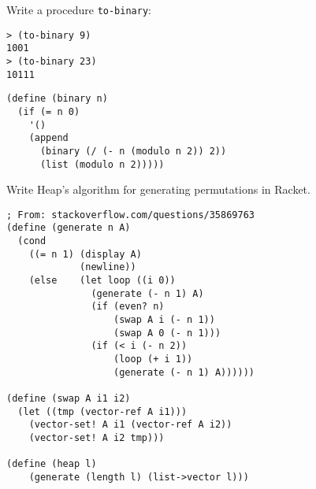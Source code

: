 \begin{questions}
\question
Write a procedure \texttt{to-binary}:
\begin{verbatim}
> (to-binary 9)
1001
> (to-binary 23)
10111
\end{verbatim}

\begin{solution}
  \begin{verbatim}
(define (binary n)
  (if (= n 0)
    '()
    (append
      (binary (/ (- n (modulo n 2)) 2))
      (list (modulo n 2)))))
  \end{verbatim}
\end{solution}

\question
Write Heap's algorithm for generating permutations in Racket.

\begin{solution}
  \begin{verbatim}
; From: stackoverflow.com/questions/35869763
(define (generate n A)
  (cond
    ((= n 1) (display A)
             (newline))
    (else    (let loop ((i 0))
               (generate (- n 1) A)
               (if (even? n)
                   (swap A i (- n 1))
                   (swap A 0 (- n 1)))
               (if (< i (- n 2))
                   (loop (+ i 1))
                   (generate (- n 1) A))))))

(define (swap A i1 i2)
  (let ((tmp (vector-ref A i1)))
    (vector-set! A i1 (vector-ref A i2))
    (vector-set! A i2 tmp)))

(define (heap l)
	(generate (length l) (list->vector l)))
  \end{verbatim}
\end{solution}

\end{questions}

